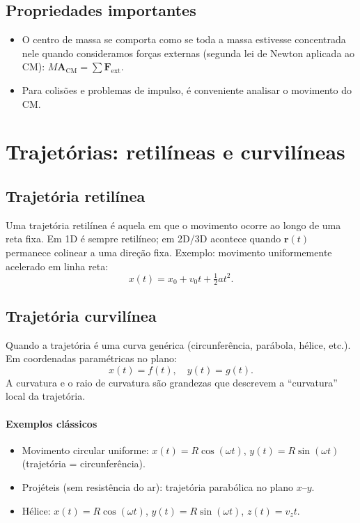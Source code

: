 \documentclass[a4paper,12pt]{article}
\begin{document}
	\subsection{Propriedades importantes}
	\begin{itemize}
		\item O centro de massa se comporta como se toda a massa estivesse concentrada nele quando consideramos forças externas (segunda lei de Newton aplicada ao CM): $M\mathbf{A}_{\mathrm{CM}}=\sum \mathbf{F}_{\mathrm{ext}}$.
		\item Para colisões e problemas de impulso, é conveniente analisar o movimento do CM.
	\end{itemize}
	
	\section{Trajetórias: retilíneas e curvilíneas}
	\subsection{Trajetória retilínea}
	Uma trajetória retilínea é aquela em que o movimento ocorre ao longo de uma reta fixa. Em 1D é sempre retilíneo; em 2D/3D acontece quando $\mathbf{r}(t)$ permanece colinear a uma direção fixa.
	Exemplo: movimento uniformemente acelerado em linha reta:
	\[ x(t)=x_0+v_0 t + \tfrac{1}{2} a t^2. \]
	
	\subsection{Trajetória curvilínea}
	Quando a trajetória é uma curva genérica (circunferência, parábola, hélice, etc.). Em coordenadas paramétricas no plano:
	\[ x(t)=f(t),\quad y(t)=g(t). \]
	A curvatura e o raio de curvatura são grandezas que descrevem a ``curvatura'' local da trajetória.
	
	\paragraph{Exemplos clássicos}
	\begin{itemize}
		\item Movimento circular uniforme: $x(t)=R\cos(\omega t)$, $y(t)=R\sin(\omega t)$ (trajetória = circunferência).
		\item Projéteis (sem resistência do ar): trajetória parabólica no plano $x$--$y$.
		\item Hélice: $x(t)=R\cos(\omega t)$, $y(t)=R\sin(\omega t)$, $z(t)=v_z t$.
	\end{itemize}
	
\end{document}
